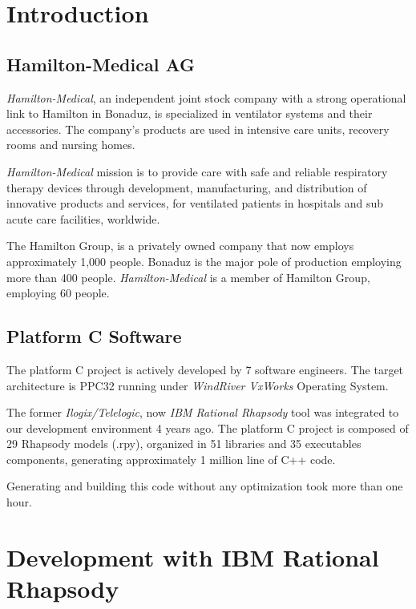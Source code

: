 \documentclass[dvips]{imsart}
\begin{document}
\section{Introduction}
\subsection{Hamilton-Medical AG}

\emph{Hamilton-Medical}, an independent joint stock company with a strong
operational link to Hamilton in Bonaduz, is specialized in ventilator systems and their
accessories. The company's products are used in intensive care units, recovery
rooms and nursing homes.

\emph{Hamilton-Medical} mission is to provide care with safe and reliable
respiratory therapy devices through development, manufacturing, and distribution of innovative products and
services, for ventilated patients in hospitals and sub acute care facilities, worldwide.

The Hamilton Group, is a privately owned company that now employs approximately
1,000 people. Bonaduz is the major pole of production employing more than 400 people.
\emph{Hamilton-Medical} is a member of Hamilton Group, employing 60 people.

\subsection{Platform C Software}

The platform C project is actively developed by 7 software engineers.
The target architecture is PPC32 running under \emph{WindRiver VxWorks}
Operating System.

The former \emph{Ilogix/Telelogic}, now \emph{IBM Rational Rhapsody} tool was
integrated to our development environment 4 years ago. The platform C project
is composed of 29 Rhapsody models (.rpy), organized in 51 libraries and 35
executables components, generating approximately 1 million line of C++ code.

Generating and building this code without any optimization took more than one
hour.

\section{Development with IBM Rational Rhapsody}
\end{document}
